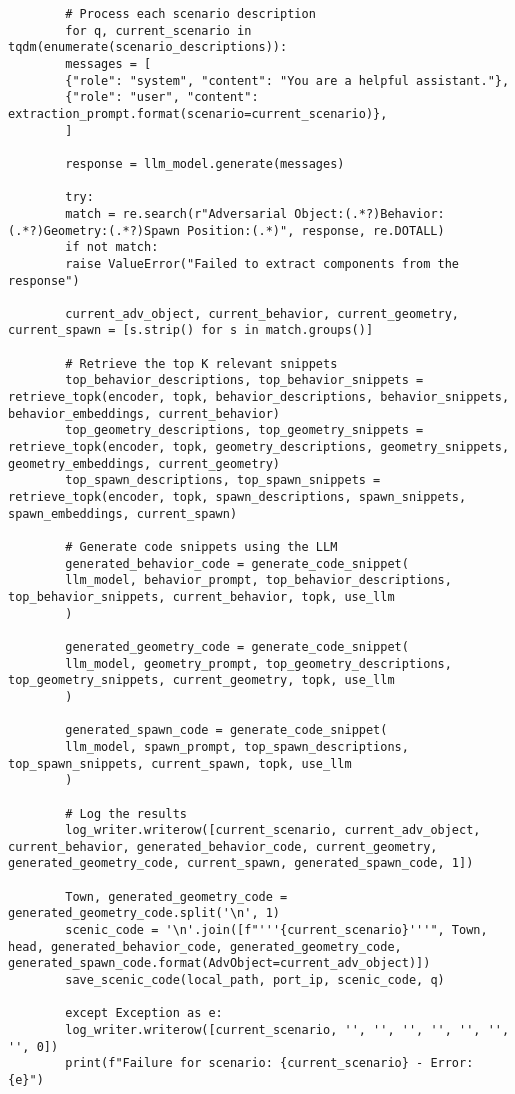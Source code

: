\begin{enumerate}
\begin{verbatim}
		# Process each scenario description
		for q, current_scenario in tqdm(enumerate(scenario_descriptions)):
		messages = [
		{"role": "system", "content": "You are a helpful assistant."},
		{"role": "user", "content": extraction_prompt.format(scenario=current_scenario)},
		]
		
		response = llm_model.generate(messages)
		
		try:
		match = re.search(r"Adversarial Object:(.*?)Behavior:(.*?)Geometry:(.*?)Spawn Position:(.*)", response, re.DOTALL)
		if not match:
		raise ValueError("Failed to extract components from the response")
		
		current_adv_object, current_behavior, current_geometry, current_spawn = [s.strip() for s in match.groups()]
		
		# Retrieve the top K relevant snippets
		top_behavior_descriptions, top_behavior_snippets = retrieve_topk(encoder, topk, behavior_descriptions, behavior_snippets, behavior_embeddings, current_behavior)
		top_geometry_descriptions, top_geometry_snippets = retrieve_topk(encoder, topk, geometry_descriptions, geometry_snippets, geometry_embeddings, current_geometry)
		top_spawn_descriptions, top_spawn_snippets = retrieve_topk(encoder, topk, spawn_descriptions, spawn_snippets, spawn_embeddings, current_spawn)
		
		# Generate code snippets using the LLM
		generated_behavior_code = generate_code_snippet(
		llm_model, behavior_prompt, top_behavior_descriptions, top_behavior_snippets, current_behavior, topk, use_llm
		)
		
		generated_geometry_code = generate_code_snippet(
		llm_model, geometry_prompt, top_geometry_descriptions, top_geometry_snippets, current_geometry, topk, use_llm
		)
		
		generated_spawn_code = generate_code_snippet(
		llm_model, spawn_prompt, top_spawn_descriptions, top_spawn_snippets, current_spawn, topk, use_llm
		)
		
		# Log the results
		log_writer.writerow([current_scenario, current_adv_object, current_behavior, generated_behavior_code, current_geometry, generated_geometry_code, current_spawn, generated_spawn_code, 1])
		
		Town, generated_geometry_code = generated_geometry_code.split('\n', 1)
		scenic_code = '\n'.join([f"'''{current_scenario}'''", Town, head, generated_behavior_code, generated_geometry_code, generated_spawn_code.format(AdvObject=current_adv_object)])
		save_scenic_code(local_path, port_ip, scenic_code, q)
		
		except Exception as e:
		log_writer.writerow([current_scenario, '', '', '', '', '', '', '', 0])
		print(f"Failure for scenario: {current_scenario} - Error: {e}")
		
		
	\end{verbatim}
\end{enumerate}

